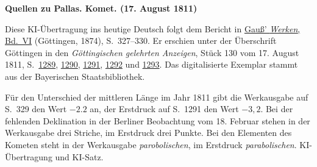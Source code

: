 \clearpage\thispagestyle{empty}
\begin{center}\textbf{Quellen zu Pallas. Komet. (17. August 1811)}\end{center}
\noindent Diese KI-Übertragung ins heutige Deutsch folgt dem Bericht in \href{https://gdz.sub.uni-goettingen.de/id/PPN236007467}{Gauß’ \textit{Werken}, Bd.~VI} (Göttingen, 1874), S.~327--330. Er erschien unter der Überschrift Göttingen in den \textit{Göttingischen gelehrten Anzeigen}, Stück 130 vom 17. August 1811, S.~\href{https://api.digitale-sammlungen.de/iiif/image/v2/bsb10538680_00265/full/1600,/0/default.jpg}{1289}, \href{https://api.digitale-sammlungen.de/iiif/image/v2/bsb10538680_00266/full/1600,/0/default.jpg}{1290}, \href{https://api.digitale-sammlungen.de/iiif/image/v2/bsb10538680_00267/full/1600,/0/default.jpg}{1291}, \href{https://api.digitale-sammlungen.de/iiif/image/v2/bsb10538680_00268/full/1600,/0/default.jpg}{1292} und \href{https://api.digitale-sammlungen.de/iiif/image/v2/bsb10538680_00269/full/1600,/0/default.jpg}{1293}. Das digitalisierte Exemplar stammt aus der Bayerischen Staatsbibliothek.
\par\smallskip\noindent Für den Unterschied der mittleren Länge im Jahr 1811 gibt die Werkausgabe auf S.~329 den Wert $-2.2$ an, der Erstdruck auf S.~1291 den Wert $-3{,}2$. Bei der fehlenden Deklination in der Berliner Beobachtung vom 18. Februar stehen in der Werkausgabe drei Striche, im Erstdruck drei Punkte. Bei den Elementen des Kometen steht in der Werkausgabe \textit{parobolischen}, im Erstdruck \textit{parabolischen}. KI-Übertragung und KI-Satz.
\clearpage

